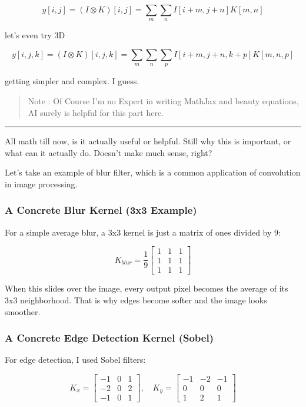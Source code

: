 \documentclass[
]{article}
\begin{document}
\[y[i, j] = (I \otimes K)[i, j] = \sum_{m} \sum_{n} I[i + m, j + n] K[m, n]\]

let's even try 3D

\[y[i, j, k] = (I \otimes K)[i, j, k] = \sum_{m} \sum_{n} \sum_{p} I[i + m, j + n, k + p] K[m, n, p]\]

getting simpler and complex. I guess.

\begin{quote}
Note : Of Course I'm no Expert in writing MathJax and beauty equations,
AI surely is helpful for this part here.
\end{quote}

\begin{center}\rule{0.5\linewidth}{0.5pt}\end{center}

All math till now, is it actually useful or helpful. Still why this is
important, or what can it actually do. Doesn't make much sense, right?

Let's take an example of blur filter, which is a common application of
convolution in image processing.

\subsubsection{A Concrete Blur Kernel (3x3
Example)}\label{a-concrete-blur-kernel-3x3-example}

For a simple average blur, a 3x3 kernel is just a matrix of ones divided
by 9:

\[K_{blur} = \frac{1}{9}\begin{bmatrix}
1 & 1 & 1 \\
1 & 1 & 1 \\
1 & 1 & 1
\end{bmatrix}\]

When this slides over the image, every output pixel becomes the average
of its 3x3 neighborhood. That is why edges become softer and the image
looks smoother.

\subsubsection{A Concrete Edge Detection Kernel
(Sobel)}\label{a-concrete-edge-detection-kernel-sobel}

For edge detection, I used Sobel filters:

\[K_x = \begin{bmatrix}
-1 & 0 & 1 \\
-2 & 0 & 2 \\
-1 & 0 & 1
\end{bmatrix},\quad
K_y = \begin{bmatrix}
-1 & -2 & -1 \\
0 & 0 & 0 \\
1 & 2 & 1
\end{bmatrix}\]
\end{document}
